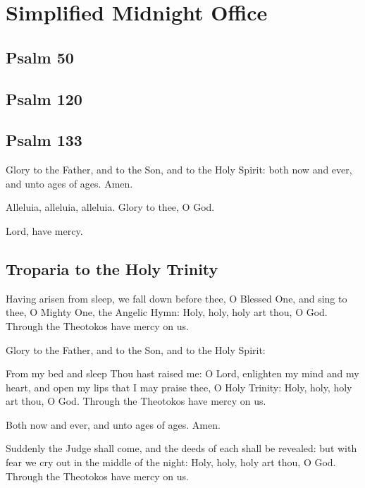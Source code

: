 \section{Simplified Midnight Office}



\subsection{Psalm 50}



\subsection{Psalm 120}



\subsection{Psalm 133}



Glory to the Father, and to the Son, and to the Holy Spirit: both now and ever, and unto ages of ages. Amen.

Alleluia, alleluia, alleluia. Glory to thee, O God. 

Lord, have mercy. 

\subsection{Troparia to the Holy Trinity}

Having arisen from sleep, we fall down before thee, O Blessed One, and sing to thee, O Mighty One, the Angelic Hymn: Holy, holy, holy art thou, O God. Through the Theotokos have mercy on us.

Glory to the Father, and to the Son, and to the Holy Spirit:

From my bed and sleep Thou hast raised me: O Lord, enlighten my mind and my heart, and open my lips that I may praise thee, O Holy Trinity: Holy, holy, holy art thou, O God. Through the Theotokos have mercy on us.

Both now and ever, and unto ages of ages. Amen.

Suddenly the Judge shall come, and the deeds of each shall be revealed: but with fear we cry out in the middle of the night: Holy, holy, holy art thou, O God. Through the Theotokos have mercy on us.

